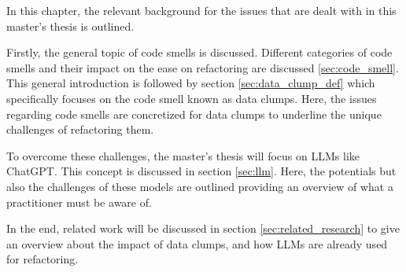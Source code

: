 

In this chapter, the relevant background for the issues that are dealt with in this master's thesis is outlined. 

Firstly, the general topic of code smells is discussed. Different categories of code smells and their impact on the ease on refactoring are discussed  \ref{sec:code_smell}. This general introduction is followed by  section \ref{sec:data_clump_def} which  specifically focuses on the code smell known as data clumps. Here, the issues regarding code smells  are concretized for data clumps to underline the unique challenges of refactoring them.

To overcome these challenges, the master's thesis will focus on \acp{LLM} like ChatGPT. This concept is discussed in section \ref{sec:llm}. Here, the potentials but also the challenges of these models are outlined providing an overview of what a practitioner must be aware of.

In the end, related work  will be discussed in section \ref{sec:related_research} to give an overview about the impact of data clumps, and how \acp{LLM} are already used for refactoring. 








\begin{comment}





\end{comment}